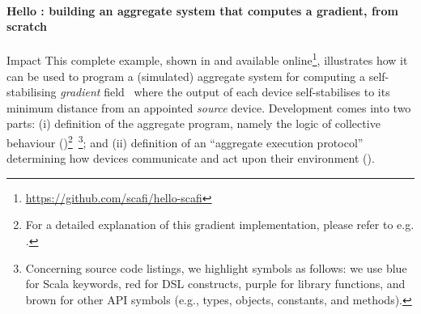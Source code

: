 \paragraph{Hello \scafi{}: building an aggregate system that computes a gradient, from scratch}
Impact
This complete example, shown in  and available online\footnote{\url{https://github.com/scafi/hello-scafi}}, illustrates how it \scafi{} can be used
 to program a (simulated) aggregate system
 for computing a self-stabilising \emph{gradient} field~\cite{DBLP:conf/sac/BealBVT08,DBLP:journals/tomacs/ViroliABDP18}
 where the output of each device self-stabilises to
 its minimum distance from an appointed \emph{source} device.
%
Development comes into two parts:
 (i) definition of the aggregate program,
 namely the logic of collective behaviour ()\footnote{For a detailed explanation of this gradient implementation, please refer to e.g. \cite{DBLP:journals/eaai/CasadeiVAPD21}.}~\footnote{Concerning source code listings, we highlight symbols as follows: we use blue for Scala keywords, red for \scafi{} DSL constructs, purple for \scafi{} library functions, and brown for other \scafi{} API symbols (e.g., types, objects, constants, and methods).};
 and (ii) definition of an ``aggregate execution protocol''
 determining how devices communicate and act upon their environment ().
%

